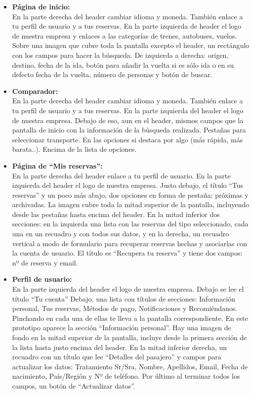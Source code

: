\begin{itemize}
    \item\textbf{Página de inicio:} \\ En la parte derecha del header cambiar idioma y moneda. También enlace a tu perfil de usuario y a tus reservas. 
    En la parte izquierda de header el logo de nuestra empresa y enlaces a las categorías de trenes, autobuses, vuelos.
    Sobre una imagen que cubre toda la pantalla excepto el header, un rectángulo con los campos para hacer la búsqueda. De izquierda a derecha: origen, destino, fecha de la ida, botón para añadir la vuelta si es sólo ida o en su defecto fecha de la vuelta, número de personas y botón de buscar. 
    
    \item\textbf{Comparador:} \\ En la parte derecha del header cambiar idioma y moneda. También enlace a tu perfil de usuario y a tus reservas. 
    En la parte izquierda del header el logo de nuestra empresa.
    Debajo de eso, aun en el header, mismos campos que la pantalla de inicio con la información de la búsqueda realizada.
    Pestañas para seleccionar transporte.
    En las opciones si destaca por algo (más rápida, más barata..).
    Encima de la lista de opciones.

    \item\textbf{Página de ``Mis reservas'':} \\ En la parte derecha del header enlace a tu perfil de usuario. En la parte izquierda del header el logo de nuestra empresa.
    Justo debajo, el título “Tus reservas” y un poco más abajo, dos opciones en forma de pestaña: próximas y archivadas.
    La imagen cubre toda la mitad superior de la pantalla, incluyendo desde las pestañas hasta encima del header.
    En la mitad inferior dos secciones: en la izquierda una lista con las reservas del tipo seleccionado, cada una en un recuadro y con todos sus datos, y en la derecha, un recuadro vertical a modo de formulario para recuperar reservas hechas y asociarlas con la cuenta de usuario. El título es “Recupera tu reserva” y tiene dos campos: nº de reserva y email.
    
    \item\textbf{Perfil de usuario:} \\ En la parte izquierda del header el logo de nuestra empresa. 
    Debajo se lee el título “Tu cuenta”
    Debajo, una lista con títulos de secciones: Información personal, Tus reservas, Métodos de pago, Notificaciones y Recomiéndanos. Pinchando en cada una de ellas te lleva a la pantalla correspondiente. En este prototipo aparece la sección “Información personal”.
    Hay una imagen de fondo en la mitad superior de la pantalla, incluye desde la primera sección de la lista hasta justo encima del header.
    En la mitad inferior derecha, un recuadro con un título que lee “Detalles del pasajero” y campos para actualizar los datos: Tratamiento Sr/Sra, Nombre, Apellidos, Email, Fecha de nacimiento, País/Región y Nº de teléfono. Por último al terminar todos los campos, un botón de “Actualizar datos”.
    
    
\end{itemize}


